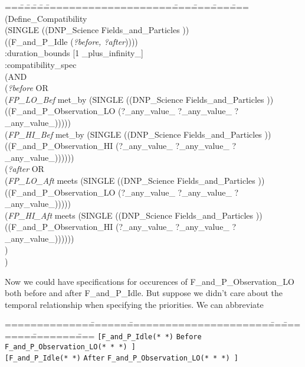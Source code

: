 \begin{tabbing}
==\==\==\==\==\=====================\====\====\====\====\kill
(Define\_Compatibility\\
\>  (SINGLE ((DNP\_Science Fields\_and\_Particles ))\\
\>\>\>      ((F\_and\_P\_Idle ({\em ?before, ?after}))))\\
\>    :duration\_bounds [1 \_plus\_infinity\_]\\
\>    :compatibility\_spec\\
\>  (AND\\
\>\>   ({\em ?before}  OR\\
\>\>\>   ({\em FP\_LO\_Bef} met\_by (SINGLE ((DNP\_Science Fields\_and\_Particles ))\\
\>\>\>\>\>        ((F\_and\_P\_Observation\_LO (?\_any\_value\_ ?\_any\_value\_ ?\_any\_value\_)))))\\
\>\>\>    ({\em FP\_HI\_Bef} met\_by (SINGLE ((DNP\_Science Fields\_and\_Particles ))\\
\>\>\>\>\>         ((F\_and\_P\_Observation\_HI (?\_any\_value\_ ?\_any\_value\_ ?\_any\_value\_))))))\\
\> \> ({\em ?after}  OR\\
\>\>\>   ({\em FP\_LO\_Aft} meets (SINGLE ((DNP\_Science Fields\_and\_Particles ))\\
\>\>\>\>\>        ((F\_and\_P\_Observation\_LO (?\_any\_value\_ ?\_any\_value\_ ?\_any\_value\_)))))\\
\>\>\>    ({\em FP\_HI\_Aft} meets (SINGLE ((DNP\_Science Fields\_and\_Particles ))\\
\>\>\>\>\>         ((F\_and\_P\_Observation\_HI (?\_any\_value\_ ?\_any\_value\_ ?\_any\_value\_))))))\\
\>   )\\
)\\
\end{tabbing}

Now we could have specifications for occurences of F\_and\_P\_Observation\_LO both 
before and after F\_and\_P\_Idle.  But suppose we didn't care about the temporal
relationship when specifying the priorities.  We can abbreviate 
\begin{tabbing}
=============\=======\=======================\===\========\========\====\kill
{\tt[F\_and\_P\_Idle(* *)} \> {\tt Before} \> {\tt  F\_and\_P\_Observation\_LO(* * *) ]} \\  
{\tt[F\_and\_P\_Idle(* *)} \> {\tt After} \> {\tt  F\_and\_P\_Observation\_LO(* * *) ]} \\  
\end{tabbing}

